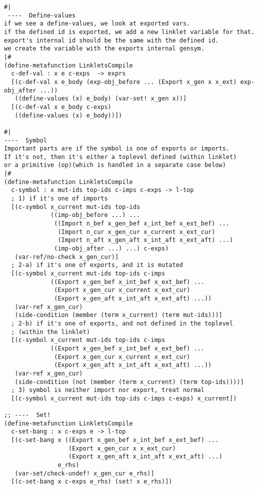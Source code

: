 \begin{lstlisting}[language=pltredex,
                basicstyle=\ttfamily\scriptsize,
                numbers=none, xleftmargin=2em]
#|
 ----  Define-values
if we see a define-values, we look at exported vars.
if the defined id is exported, we add a new linklet variable for that.
export's internal id should be the same with the defined id.
we create the variable with the exports internal gensym.
|#
(define-metafunction LinkletsCompile
  c-def-val : x e c-exps  -> exprs
  [(c-def-val x e_body (exp-obj_before ... (Export x_gen x x_ext) exp-obj_after ...))
   ((define-values (x) e_body) (var-set! x_gen x))]
  [(c-def-val x e_body c-exps)
   ((define-values (x) e_body))])

#|
----  Symbol
Important parts are if the symbol is one of exports or imports.
If it's not, then it's either a toplevel defined (within linklet)
or a primitive (op)(which is handled in a separate case below)
|#
(define-metafunction LinkletsCompile
  c-symbol : x mut-ids top-ids c-imps c-exps -> l-top
  ; 1) if it's one of imports
  [(c-symbol x_current mut-ids top-ids
             ((imp-obj_before ...) ...
              ((Import n_bef x_gen_bef x_int_bef x_ext_bef) ...
               (Import n_cur x_gen_cur x_current x_ext_cur)
               (Import n_aft x_gen_aft x_int_aft x_ext_aft) ...)
              (imp-obj_after ...) ...) c-exps)
   (var-ref/no-check x_gen_cur)]
  ; 2-a) if it's one of exports, and it is mutated
  [(c-symbol x_current mut-ids top-ids c-imps
             ((Export x_gen_bef x_int_bef x_ext_bef) ...
              (Export x_gen_cur x_current x_ext_cur)
              (Export x_gen_aft x_int_aft x_ext_aft) ...))
   (var-ref x_gen_cur)
   (side-condition (member (term x_current) (term mut-ids)))]
  ; 2-b) if it's one of exports, and not defined in the toplevel
  ; (within the linklet)
  [(c-symbol x_current mut-ids top-ids c-imps
             ((Export x_gen_bef x_int_bef x_ext_bef) ...
              (Export x_gen_cur x_current x_ext_cur)
              (Export x_gen_aft x_int_aft x_ext_aft) ...))
   (var-ref x_gen_cur)
   (side-condition (not (member (term x_current) (term top-ids))))]
  ; 3) symbol is neither import nor export, treat normal
  [(c-symbol x_current mut-ids top-ids c-imps c-exps) x_current])

;; ----  Set!
(define-metafunction LinkletsCompile
  c-set-bang : x c-exps e -> l-top
  [(c-set-bang x ((Export x_gen_bef x_int_bef x_ext_bef) ...
                  (Export x_gen_cur x x_ext_cur)
                  (Export x_gen_aft x_int_aft x_ext_aft) ...)
               e_rhs)
   (var-set/check-undef! x_gen_cur e_rhs)]
  [(c-set-bang x c-exps e_rhs) (set! x e_rhs)])


\end{lstlisting}
